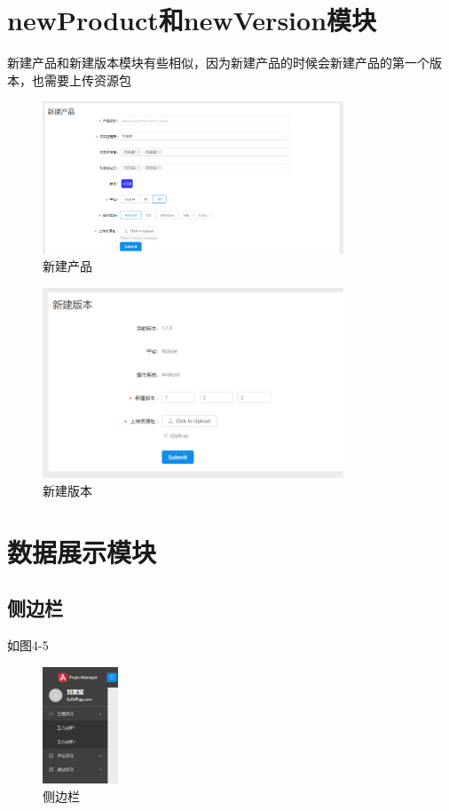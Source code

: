 \section{newProduct和newVersion模块}
新建产品和新建版本模块有些相似，因为新建产品的时候会新建产品的第一个版本，也需要上传资源包
\begin{figure}[h]
	\centering
	\includegraphics[width=0.8\textwidth]{image/result/product.png}
	\caption{新建产品}
	\label{fig:newProduct}
\end{figure}
\begin{figure}[h]
	\centering
	\includegraphics[width=0.8\textwidth]{image/result/version.png}
	\caption{新建版本}
	\label{fig:newVersion}
\end{figure}
\section{数据展示模块}
\subsection{侧边栏}
如图4-5
\begin{figure}[h]
	\centering
	\includegraphics[width=0.2\textwidth]{image/result/sidebar.png}
	\caption{侧边栏}
	\label{fig:side}
\end{figure}
